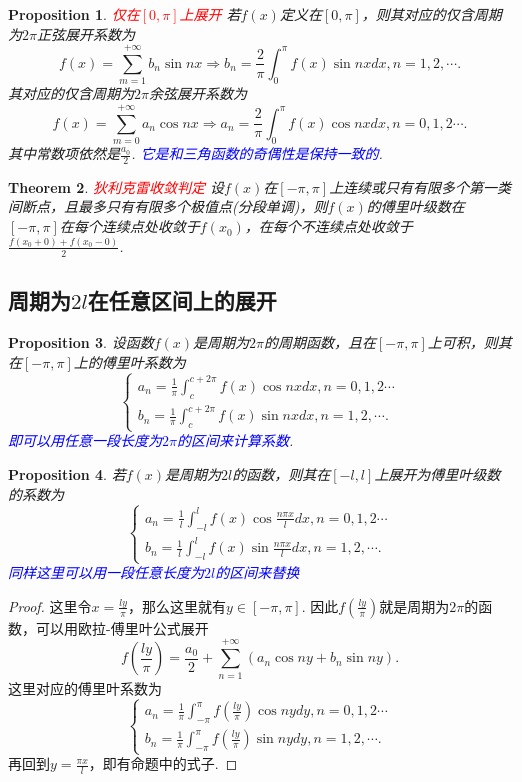 \documentclass{article}
\newtheorem{theorem}{Theorem}[section]
\newtheorem{proposition}[theorem]{Proposition}
\newcommand{\redt}[1]{\textcolor{red}{#1}}
\newcommand{\bluet}[1]{\textcolor{blue}{#1}}
\begin{document}
\begin{proposition}
\rm \redt{仅在$[0,\pi]$上展开} 若$f(x)$定义在$[0,\pi]$，则其对应的仅含周期为$2\pi$正弦展开系数为
$$
f(x) = \sum\limits_{m=1}^{+\infty}b_n\sin nx \Rightarrow b_n = \frac{2}{\pi} \int_{0}^{\pi} f(x)\sin nx dx,n = 1,2,\cdots.
$$
其对应的仅含周期为$2\pi$余弦展开系数为
$$
f(x) = \sum\limits_{m=0}^{+\infty}a_n\cos nx \Rightarrow a_n = \frac{2}{\pi} \int_{0}^{\pi} f(x)\cos nx dx, n = 0,1,2\cdots. 
$$
其中常数项依然是$\frac{a_0}{2}$. \bluet{它是和三角函数的奇偶性是保持一致的}.
\end{proposition}

\begin{theorem}
\rm \redt{狄利克雷收敛判定} 设$f(x)$在$[-\pi,\pi]$上连续或只有有限多个第一类间断点，且最多只有有限多个极值点(分段单调)，则$f(x)$的傅里叶级数在$[-\pi,\pi]$在每个连续点处收敛于$f(x_0)$，在每个不连续点处收敛于$\frac{f(x_0 + 0) + f(x_0-0)}{2}$. 
\end{theorem}

\subsection{周期为$2l$在任意区间上的展开}

\begin{proposition}
\rm 设函数$f(x)$是周期为$2\pi$的周期函数，且在$[-\pi,\pi]$上可积，则其在$[-\pi,\pi]$上的傅里叶系数为
$$
\left\{
\begin{array}{ll}
a_n = \frac{1}{\pi} \int_{c}^{c+2\pi} f(x)\cos nxdx, n =  0,1,2\cdots \\
b_n = \frac{1}{\pi} \int_{c}^{c+2\pi} f(x)\sin nxdx, n = 1,2,\cdots.
\end{array} \right.
$$
\bluet{即可以用任意一段长度为$2\pi$的区间来计算系数}.
\end{proposition}

\begin{proposition}
\rm 若$f(x)$是周期为$2l$的函数，则其在$[-l,l]$上展开为傅里叶级数的系数为
$$
\left\{
\begin{array}{ll}
a_n = \frac{1}{l} \int_{-l}^{l} f(x)\cos \frac{n\pi x}{l}dx, n =  0,1,2 \cdots \\
b_n = \frac{1}{l} \int_{-l}^{l} f(x)\sin \frac{n\pi x}{l}dx, n = 1,2,\cdots.
\end{array} \right.
$$
\bluet{同样这里可以用一段任意长度为$2l$的区间来替换}
\end{proposition}

\begin{proof}
\rm 这里令$x=\frac{ly}{\pi}$，那么这里就有$y \in [-\pi,\pi]$. 因此$f(\frac{ly}{\pi})$就是周期为$2\pi$的函数，可以用欧拉-傅里叶公式展开
$$
f\left(\frac{ly}{\pi}\right) = \frac{a_0}{2} + \sum\limits_{n=1}^{+\infty}(a_n\cos ny + b_n \sin ny).  
$$
这里对应的傅里叶系数为
$$
\left\{
\begin{array}{ll}
a_n = \frac{1}{\pi} \int_{-\pi}^{\pi} f\left(\frac{ly}{\pi}\right)\cos nydy, n =  0,1,2\cdots \\
b_n = \frac{1}{\pi} \int_{-\pi}^{\pi} f\left(\frac{ly}{\pi}\right)\sin nydy, n = 1,2,\cdots.
\end{array} \right.
$$
再回到$y = \frac{\pi x}{l}$，即有命题中的式子. 
\end{proof}
\end{document}
